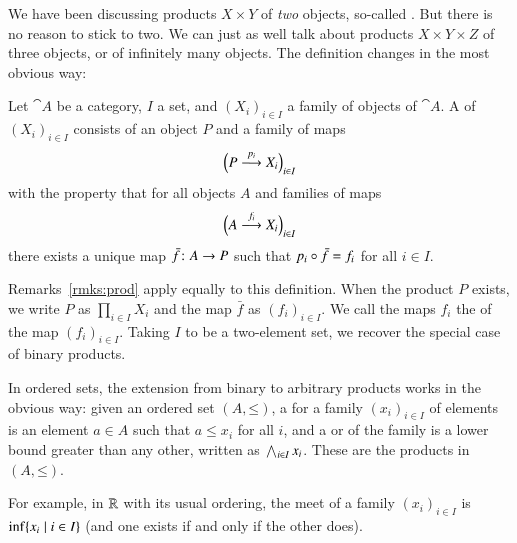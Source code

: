 We have been discussing products $X \times Y$ of \emph{two} objects,
so-called .  But there is no reason to stick to two.  We can just as well
talk about products $X \times Y \times Z$ of three objects, or of
infinitely many objects.  The definition changes in the most obvious way:

\begin{defn}    
\label{defn:gen-prod}
Let $\cat{A}$ be a category, $I$ a set, and $(X_i)_{i \in I}$ a family of
objects of $\cat{A}$.  A %
%
%
of $(X_i)_{i \in I}$ consists of an object $P$ and a family of maps
\[
\Bigl(P \stackrel{p_i}{\longrightarrow} X_i\Bigr)_{i \in I}
\]
with the property that for all objects $A$ and families of maps
% 
\begin{equation}        
\label{eq:gen-prod-cone}
\Bigl(A \stackrel{f_i}{\longrightarrow} X_i\Bigr)_{i \in I}
\end{equation}
% 
there exists a unique map $\bar{f}\from A \to P$ such that $p_i \mathbin{\circ} \bar{f} =
f_i$ for all $i \in I$.
\end{defn}

Remarks~\ref{rmks:prod} apply equally to this definition.  When the product
$P$ exists, we write $P$ as $\prod_{i \in I} X_i$%
%
%
and the map $\bar{f}$ as $(f_i)_{i \in I}$.%
%
%
We call the maps $f_i$ the %
%
%
of the map $(f_i)_{i \in I}$.  Taking $I$ to be a two-element set, we
recover the special case of binary products.

\begin{example}        
In ordered sets, the extension from binary to arbitrary products works in
the obvious way: given an ordered set $(A, \mathord{\leq})$, a
 for a family $(x_i)_{i \in I}$ of elements is an element $a \in A$
such that $a \leq x_i$ for all $i$, and a  or %
%
%
of the family is a lower bound greater than any other, written as $\bigwedge_{i
\in I} x_i$.%
%
%
These are the products in $(A, \mathord{\leq})$.

For example, in $\mathbb{R}$ with its usual ordering, the meet of a family
$(x_i)_{i \in I}$ is $\inf\{x_i \mathrel{|} i \in I\}$%
%
%
(and one exists if and only if the other does).
\end{example}

